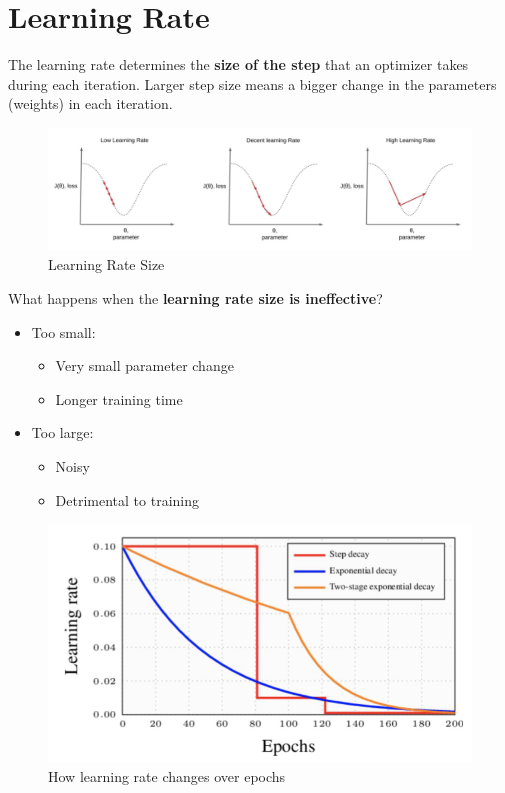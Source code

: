 \section{Learning Rate}

The learning rate determines the \textbf{size of the step} that an optimizer takes during each iteration. Larger step size means a bigger change in the parameters (weights) in each iteration.

\begin{figure}[h!t]
    \centering
    \includegraphics[width=0.8\linewidth]{learningrate.png}
    \caption{Learning Rate Size}
    \label{fig:enter-label}
\end{figure}

\begin{warning}
    What happens when the \textbf{learning rate size is ineffective}?
    \begin{itemize}
        \item Too small:
        \begin{itemize}
            \item Very small parameter change
            \item Longer training time
        \end{itemize}
        \item Too large:
        \begin{itemize}
            \item Noisy
            \item Detrimental to training
        \end{itemize}
    \end{itemize}
\end{warning}

\begin{figure}[h!t]
    \centering
    \includegraphics[width=0.5\linewidth]{learningrateoverepochs.png}
    \caption{How learning rate changes over epochs}
    \label{fig:enter-label}
\end{figure}

